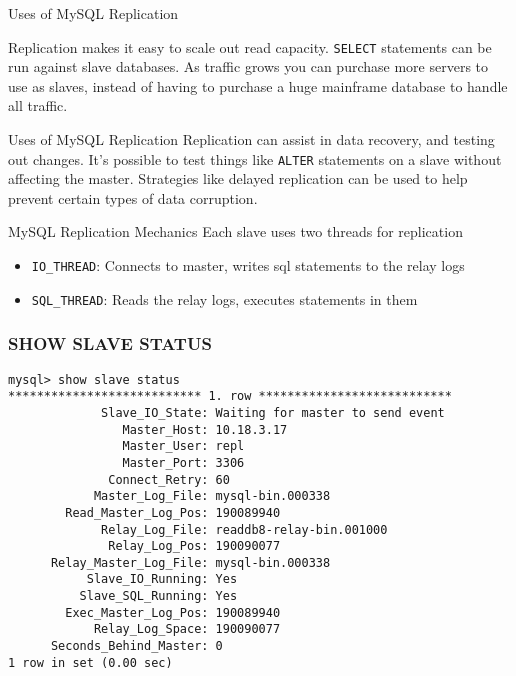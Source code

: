 \documentclass[14pt]{beamer}
\newcommand{\myitem}{\item[\textbullet]}
\begin{document}
\begin{frame}{Uses of MySQL Replication}

  Replication makes it easy to scale out read capacity.
  \newline
  \newline
  \texttt{SELECT}
  statements can be run against slave databases. As traffic grows you can
  purchase more servers to use as slaves, instead of having to purchase a huge
  mainframe database to handle all traffic.

\end{frame}

\begin{frame}{Uses of MySQL Replication}
  Replication can assist in data recovery, and testing out changes. It's
  possible to test things like \texttt{ALTER} statements on a slave without
  affecting the master.
  \newline
  \newline
  Strategies like delayed replication can be used to help
  prevent certain types of data corruption.
\end{frame}

\begin{frame}{MySQL Replication Mechanics}
  Each slave uses two threads for replication
  \begin{itemize}
  \myitem \texttt{IO\_THREAD}: Connects to master, writes sql statements to the relay logs
  \myitem \texttt{SQL\_THREAD}: Reads the relay logs, executes statements in them
  \end{itemize}
\end{frame}

\begin{frame}[fragile]
  \frametitle{SHOW SLAVE STATUS}
  \begingroup
    \fontsize{10pt}{10pt}\selectfont
    \begin{verbatim}
mysql> show slave status
*************************** 1. row ***************************
             Slave_IO_State: Waiting for master to send event
                Master_Host: 10.18.3.17
                Master_User: repl
                Master_Port: 3306
              Connect_Retry: 60
            Master_Log_File: mysql-bin.000338
        Read_Master_Log_Pos: 190089940
             Relay_Log_File: readdb8-relay-bin.001000
              Relay_Log_Pos: 190090077
      Relay_Master_Log_File: mysql-bin.000338
           Slave_IO_Running: Yes
          Slave_SQL_Running: Yes
        Exec_Master_Log_Pos: 190089940
            Relay_Log_Space: 190090077
      Seconds_Behind_Master: 0
1 row in set (0.00 sec)
    \end{verbatim}
\endgroup
\end{frame}
\end{document}
